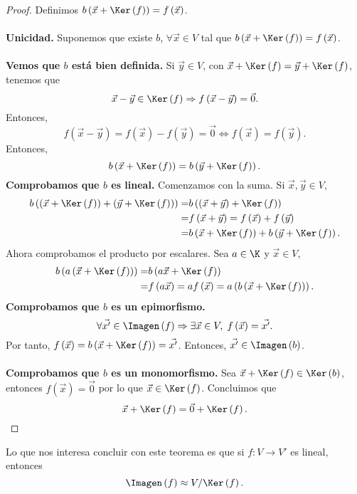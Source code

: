 \begin{proof}
Definimos $\displaystyle b\left(\vec{x}+\Ker\left(f\right)\right) = f\left(\vec{x}\right) $. \\ \\
\textbf{Unicidad.} Suponemos que existe $\displaystyle b $, $\displaystyle \forall\vec{x} \in V $ tal que $\displaystyle b\left(\vec{x} + \Ker\left(f\right)\right) = f\left(\vec{x}\right) $. \\ \\
\textbf{Vemos que $\displaystyle b $ está bien definida.} Si $\displaystyle \vec{y} \in V $, con $\displaystyle \vec{x} + \Ker\left(f\right) = \vec{y} + \Ker\left(f\right) $, tenemos que
	\[\vec{x}-\vec{y} \in \Ker\left(f\right) \Rightarrow f\left(\vec{x}-\vec{y}\right) = \vec{0} .\]
Entonces, 
\[ f\left(\vec{x}-\vec{y}\right) = f\left(\vec{x}\right)-f\left(\vec{y}\right) = \vec{0} \iff f(\vec{x}) = f(\vec{y}) .\]
Entonces, 
\[b\left(\vec{x}+\Ker\left(f\right)\right) = b\left(\vec{y}+\Ker\left(f\right)\right) .\]
 \textbf{Comprobamos que $\displaystyle b $ es lineal.} Comenzamos con la suma. Si $\displaystyle \vec{x}, \vec{y} \in V $, 
\[
\begin{split}
	b \left(\left(\vec{x}+\Ker\left(f\right)\right) + \left(\vec{y}+\Ker\left(f\right)\right)\right)   = & b \left(\left(\vec{x}+\vec{y}\right)+\Ker\left(f\right)\right) \\
	= & f\left(\vec{x}+\vec{y}\right) = f\left(\vec{x}\right) + f\left(\vec{y}\right) \\
	= & b\left(\vec{x} + \Ker\left(f\right)\right) + b\left(\vec{y} + \Ker\left(f\right)\right) .
\end{split}
\]
Ahora comprobamos el producto por escalares. Sea $\displaystyle a \in \K $ y $\displaystyle \vec{x} \in V $, 
\[
\begin{split}
	b\left(a\left(\vec{x}+\Ker\left(f\right)\right)\right) = & b\left(a\vec{x}+\Ker\left(f\right)\right) \\
	= & f\left(a\vec{x}\right) = af\left(\vec{x}\right) = a\left(b\left(\vec{x}+\Ker\left(f\right)\right)\right) .
\end{split}
\]
 \textbf{Comprobamos que $\displaystyle b $ es un epimorfismo.} 
	\[\forall \vec{x'} \in \Imagen\left(f\right) \Rightarrow \exists \vec{x} \in V, \; f\left(\vec{x}\right) = \vec{x'} .\]
Por tanto, $\displaystyle f\left(\vec{x}\right) = b\left(\vec{x}+ \Ker\left(f\right)\right) = \vec{x'} $. Entonces, $\displaystyle \vec{x'} \in \Imagen\left(b\right) $. \\ \\
 \textbf{Comprobamos que $\displaystyle b $ es un monomorfismo.} Sea $\displaystyle \vec{x} + \Ker\left(f\right) \in \Ker\left(b\right) $, entonces $\displaystyle f\left(\vec{x}\right) = \vec{0} $ por lo que $\displaystyle \vec{x} \in \Ker\left(f\right) $. Concluimos que
	\[\vec{x}+\Ker\left(f\right) = \vec{0} + \Ker\left(f\right) .\]
\end{proof}
\begin{observation}
\normalfont Lo que nos interesa concluir con este teorema es que si $\displaystyle f: V \to V' $ es lineal, entonces
\[\Imagen\left(f\right) \approx V/\Ker\left(f\right) .\]
\end{observation}

